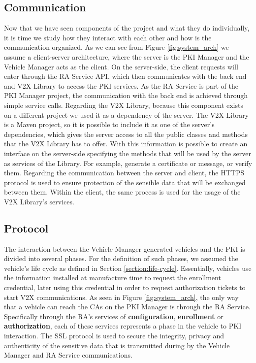 \subsection{Communication}
Now that we have seen components of the project and what they do individually, it is time we study how they interact with each other and how is the communication organized. 
As we can see from Figure \ref{fig:system_arch} we assume a client-server architecture, where the server is the PKI Manager and the Vehicle Manager acts as the client. On the server-side, the client requests will enter through the RA Service API, which then communicates with the back end and V2X Library to access the PKI services. As the RA Service is part of the PKI Manager project, the communication with the back end is achieved through simple service calls. Regarding the V2X Library, because this component exists on a different project we used it as a dependency of the server. The V2X Library is a Maven project, so it is possible to include it as one of the server's dependencies, which gives the server access to all the public classes and methods that the V2X Library has to offer. With this information is possible to create an interface on the server-side specifying the methods that will be used by the server as services of the Library. For example, generate a certificate or message, or verify them. Regarding the communication between the server and client, the HTTPS protocol is used to ensure protection of the sensible data that will be exchanged between them. Within the client, the same process is used for the usage of the V2X Library's services.



\subsection{Protocol} \label{protocol}
The interaction between the Vehicle Manager generated vehicles and the PKI is divided into several phases. For the definition of such phases, we assumed the vehicle's life cycle as defined in Section \ref{section:life-cycle}. Essentially, vehicles use the information installed at manufacture time to request the enrollment credential, later using this credential in order to request authorization tickets to start V2X communications. As seen in Figure \ref{fig:system_arch}, the only way that a vehicle can reach the CAs on the PKI Manager is through the RA Service. Specifically through the RA's services of \textbf{configuration}, \textbf{enrollment} or \textbf{authorization}, each of these services represents a phase in the vehicle to PKI interaction. The SSL protocol is used to secure the integrity, privacy and authenticity of the sensitive data that is transmitted during by the Vehicle Manager and RA Service communications.

